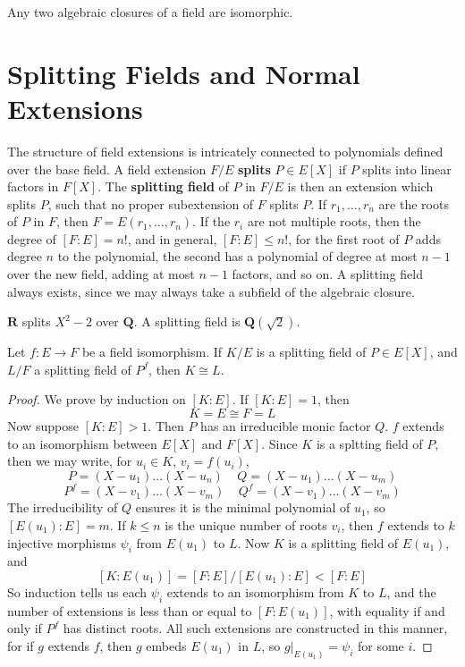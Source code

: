 \begin{corollary}
    Any two algebraic closures of a field are isomorphic.
\end{corollary}






\section{Splitting Fields and Normal Extensions}

The structure of field extensions is intricately connected to polynomials defined over the base field. A field extension $F/E$ {\bf splits} $P \in E[X]$ if $P$ splits into linear factors in $F[X]$. The {\bf splitting field} of $P$ in $F/E$ is then an extension which splits $P$, such that no proper subextension of $F$ splits $P$. If $r_1, \dots, r_n$ are the roots of $P$ in $F$, then $F = E(r_1, \dots, r_n)$. If the $r_i$ are not multiple roots, then the degree of $[F:E] = n!$, and in general, $[F:E] \leq n!$, for the first root of $P$ adds degree $n$ to the polynomial, the second has a polynomial of degree at most $n-1$ over the new field, adding at most $n-1$ factors, and so on. A splitting field always exists, since we may always take a subfield of the algebraic closure.

\begin{example}
    $\mathbf{R}$ splits $X^2 - 2$ over $\mathbf{Q}$. A splitting field is $\mathbf{Q}(\sqrt{2})$.
\end{example}

\begin{theorem}
    Let $f: E \to F$ be a field isomorphism. If $K/E$ is a splitting field of $P \in E[X]$, and $L/F$ a splitting field of $P^f$, then $K \cong L$.
\end{theorem}
\begin{proof}
    We prove by induction on $[K:E]$. If $[K:E] = 1$, then
    \[ K = E \cong F = L \]
    Now suppose $[K:E] > 1$. Then $P$ has an irreducible monic factor $Q$. $f$ extends to an isomorphism between $E[X]$ and $F[X]$. Since $K$ is a spltting field of $P$, then we may write, for $u_i \in K$, $v_i = f(u_i)$,
    \[ P = (X - u_1) \dots (X - u_n)\ \ \ \ \ Q = (X - u_1) \dots (X - u_m) \]
    \[ P^f = (X - v_1) \dots (X - v_m)\ \ \ \ \ Q^f = (X - v_1) \dots (X - v_m) \]
    The irreducibility of $Q$ ensures it is the minimal polynomial of $u_1$, so $[E(u_1): E] = m$. If $k \leq n$ is the unique number of roots $v_i$, then $f$ extends to $k$ injective morphisms $\psi_i$ from $E(u_1)$ to $L$. Now $K$ is a splitting field of $E(u_1)$, and
    \[ [K:E(u_1)] = [F:E]/[E(u_1):E] < [F:E] \]
    So induction tells us each $\psi_i$ extends to an isomorphism from $K$ to $L$, and the number of extensions is less than or equal to $[F:E(u_1)]$, with equality if and only if $P^f$ has distinct roots. All such extensions are constructed in this manner, for if $g$ extends $f$, then $g$ embeds $E(u_1)$ in $L$, so $g|_{E(u_1)} = \psi_i$ for some $i$.
\end{proof}

